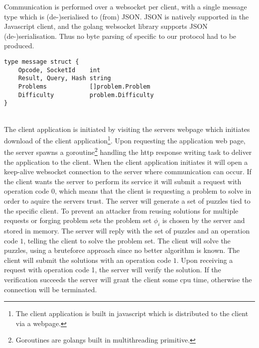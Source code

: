 Communication is performed over a websocket per client, with a single message type which is (de-)serialised to (from) JSON. JSON is natively supported in the Javascript client, and the golang websocket library supports JSON (de-)serialisation. Thus no byte parsing of specific to our protocol had to be produced.
\begin{verbatim}
type message struct {
	Opcode, SocketId    int
	Result, Query, Hash string
	Problems            []problem.Problem
	Difficulty          problem.Difficulty
}
\end{verbatim}
\\
The client application is initiated by visiting the servers webpage which initiates download of the client application\footnote{The client application is built in javascript which is distributed to the client via a webpage.}. Upon requesting the application web page, the server spawns a goroutine\footnote{Goroutines are golangs built in multithreading primitive.} handling the http response writing task to deliver the application to the client.
When the client application initiates it will open a keep-alive websocket connection to the server where communication can occur. 
If the client wants the server to perform its service it will submit a request with operation code $0$, which means that the client is requesting a problem to solve in order to aquire the servers trust. The server will generate a set of puzzles tied to the specific client. To prevent an attacker from reusing solutions for multiple requests or forging problem sets the problem set $\phi_i$ is chosen by the server and stored in memory. The server will reply with the set of puzzles and an operation code $1$, telling the client to solve the problem set. The client will solve the puzzles, using a bruteforce approach since no better algorithm is known. The client will submit the solutions with an operation code $1$. Upon receiving a request with operation code 1, the server will verify the solution. If the verification succeeds the server will grant the client some cpu time, otherwise the connection will be terminated.






